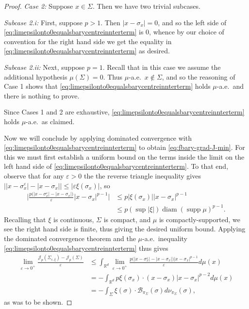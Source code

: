 \documentclass[preprint, reqno]{amsart}
\DeclareMathOperator*{\supp}{supp}
\DeclareMathOperator*{\diam}{diam}
\renewcommand{\epsilon}{\varepsilon}
\theoremstyle{definition}
\numberwithin{equation}{section}
\begin{document}
\begin{proof}
  \emph{Case 2:} Suppose $x \in \Sigma$. Then we have two trivial
  subcases.

  \emph{Subcase 2.i:} First, suppose $p > 1$. Then $|x - \sigma_x| =
  0$, and so the left side of
  \eqref{eq:limepsilonto0equalsbarycentreinnterterm} is $0$, whence by
  our choice of convention for the right hand side we get the equality
  in \eqref{eq:limepsilonto0equalsbarycentreinnterterm} as desired.

  \emph{Subcase 2.ii:} Next, suppose $p =1$. Recall that in this case
  we assume the additional hypothesis $\mu(\Sigma) = 0$. Thus
  $\mu$-a.e.\ $x \not \in \Sigma$, and so the reasoning of Case 1
  shows that \eqref{eq:limepsilonto0equalsbarycentreinnterterm} holds
  $\mu$-a.e.\ and there is nothing to prove.

  \medskip

  Since Cases 1 and 2 are exhaustive,
  \eqref{eq:limepsilonto0equalsbarycentreinnterterm} holds $\mu$-a.e.\
  as claimed.

  \medskip

  Now we will conclude by applying dominated convergence with
  \eqref{eq:limepsilonto0equalsbarycentreinnterterm} to obtain
  \eqref{eq:fbary-grad-J-min}. For this we must first establish a
  uniform bound on the terms inside the limit on the left hand side of
  \eqref{eq:limepsilonto0equalsbarycentreinnterterm}. To that end,
  observe that for any $\varepsilon > 0$ the the reverse triangle
  inequality gives $\big\lvert \lvert x - \sigma_x^\varepsilon \rvert
  - \lvert x - \sigma_x \rvert \big\rvert \leq \lvert \varepsilon
  \xi(\sigma_x) \rvert$, so
  \begin{align*}
    \bigg\lvert \frac{p \big(|x - \sigma_x^\epsilon| - |x -
    \sigma_x|\big)}{\varepsilon} |x - \sigma_x|^{p-1}\bigg\rvert
    &\leq p|\xi(\sigma_x)||x - \sigma_x|^{p-1} \\
    &\leq p (\sup \lvert \xi \rvert) \diam(\supp \mu)^{p-1}.
  \end{align*}
  Recalling that $\xi$ is continuous, $\Sigma$ is compact, and $\mu$
  is compactly-supported, we see the right hand side is finite, thus
  giving the desired uniform bound. Applying the dominated convergence
  theorem and the $\mu$-a.e.\ inequality
  \eqref{eq:limepsilonto0equalsbarycentreinnterterm} thus gives
  \begin{align*}
    \lim_{\epsilon \to 0^+}\frac{\mathscr{J}_p(\Sigma_{\epsilon,
    \xi}) - \mathscr{J}_p(\Sigma)}{\epsilon}
    &\leq \int_{\mathbb{R}^d} \lim_{\epsilon \to
      0^+} \frac{p\big(|x - \sigma_x^\epsilon| - |x - \sigma_x|\big)
      |x - \sigma_x|^{p-1}}{\varepsilon} d\mu(x) \\
    &= - \int_{\mathbb{R}^d}p \xi(\sigma_x)\cdot(x - \sigma_x)|x -
      \sigma_x|^{p-2}d\mu(x) \\
    &= - \int_{\Sigma}\xi(\sigma)\cdot
      \mathcal{B}_{\pi_{\Sigma}}(\sigma)d\nu_{\pi_{\Sigma}}(\sigma),
  \end{align*}
  as was to be shown.
\end{proof}
\end{document}
